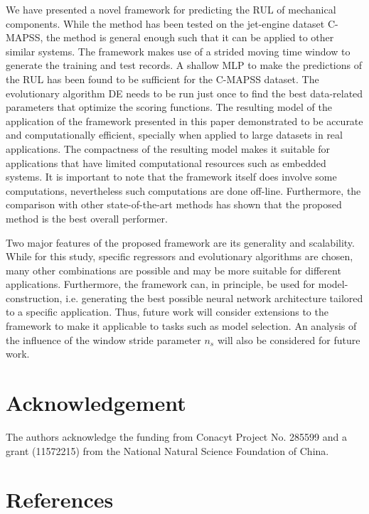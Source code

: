 \documentclass[preprint,12pt]{elsarticle}%
\begin{document}
We have presented a novel framework for predicting the RUL of mechanical
components. While the method has been tested on the jet-engine dataset
C-MAPSS, the method is general enough such that it can be applied to other similar
systems. The framework makes use of a strided moving time window to generate
the training and test records. A shallow MLP to make the predictions of the RUL
has been found to be sufficient for the C-MAPSS dataset. The evolutionary
algorithm DE needs to be run just once to find the best data-related
parameters that optimize the scoring functions. The resulting model of the application of the framework presented in this
paper demonstrated to be accurate and computationally
efficient, specially when applied to large datasets in real applications. The compactness of the resulting model makes it suitable for applications that have
limited computational resources such as embedded systems. It is important to note that the framework itself does involve some computations, nevertheless such computations are done off-line. Furthermore, the
comparison with other state-of-the-art methods has shown that the proposed
method is the best overall performer.

Two major features of the proposed framework are its generality and
scalability. While for this study, specific regressors and evolutionary
algorithms are chosen, many other combinations are possible and may be more
suitable for different applications. Furthermore, the framework can, in
principle, be used for model-construction, i.e. generating the best possible
neural network architecture tailored to a specific application. Thus, future work will consider extensions to the framework to make it applicable to tasks such as model selection. An analysis of the influence of the window stride parameter $n_s$ will also be considered for future work.

\section*{Acknowledgement}
The authors acknowledge the funding from Conacyt Project No. 285599 and a grant (11572215) from the National Natural Science Foundation of China.

\section*{References}



%
\end{document}
